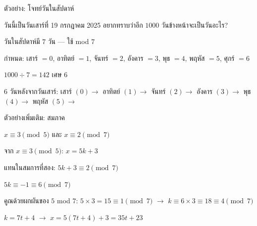 \documentclass[11pt, aspectratio=169]{beamer}
\begin{document}
\begin{frame}{ตัวอย่าง: โจทย์วันในสัปดาห์}
  \begin{exambox}[โจทย์]
    วันนี้เป็นวันเสาร์ที่ 19 กรกฎาคม 2025 อยากทราบว่าอีก $1000$ วันข้างหน้าจะเป็นวันอะไร?
  \end{exambox}

  \begin{solbox}[วิธีทำ]
    วันในสัปดาห์มี $7$ วัน — ใช้ mod $7$

    กำหนด: เสาร์ $= 0$, อาทิตย์ $= 1$, จันทร์ $= 2$, อังคาร $= 3$, พุธ $= 4$, พฤหัส $= 5$, ศุกร์ $= 6$

    $1000 \div 7 = 142$ เศษ $6$

    $6$ วันหลังจากวันเสาร์: เสาร์ $(0) \rightarrow$ อาทิตย์ $(1) \rightarrow$ จันทร์ $(2) \rightarrow$ อังคาร $(3) \rightarrow$ พุธ $(4) \rightarrow$ พฤหัส $(5) \rightarrow$ 

  \end{solbox}
\end{frame}

\begin{frame}{ตัวอย่างเพิ่มเติม: สมภาค}
  \begin{exambox}
    $x \equiv 3 \pmod{5}$ \quad และ \quad $x \equiv 2 \pmod{7}$

    จาก $x \equiv 3 \pmod{5}$: \quad $x = 5k + 3$

    แทนในสมการที่สอง: \quad $5k + 3 \equiv 2 \pmod{7}$

    $5k \equiv -1 \equiv 6 \pmod{7}$

    คูณด้วยผกผันของ $5$ mod $7$: $5 \times 3 = 15 \equiv 1 \pmod{7}$ \quad $\rightarrow$ \quad $k \equiv 6 \times 3 \equiv 18 \equiv 4 \pmod{7}$

    $k = 7t + 4$ \quad $\rightarrow$ \quad $x = 5(7t+4) + 3 = 35t + 23$

  \end{exambox}
\end{frame}
\end{document}
